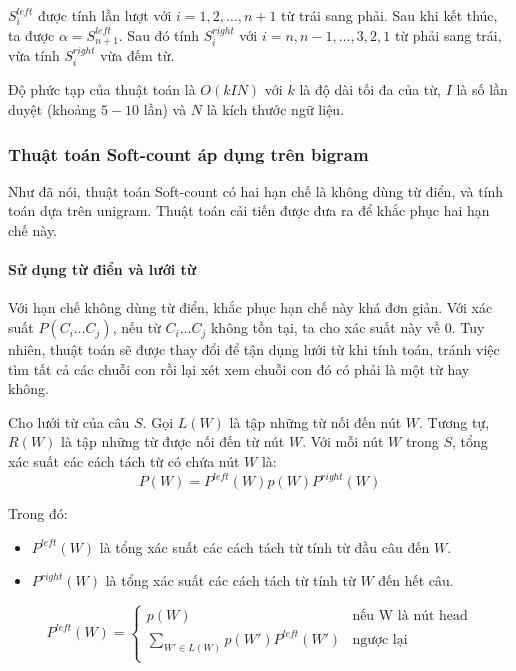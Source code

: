 \documentclass[a4paper,oneside,14pt]{extbook} %
\begin{document}
$S_i^{left}$ được tính lần lượt với $i=1,2,\ldots,n+1$ từ trái sang
phải. Sau khi kết thúc, ta được $\alpha=S_{n+1}^{left}$. Sau đó tính
$S_i^{right}$ với $i=n,n-1,\ldots,3,2,1$ từ phải sang trái, vừa tính
$S_i^{right}$ vừa đếm từ.

Độ phức tạp của thuật toán là $O(kIN)$ với $k$ là độ dài tối đa của
từ, $I$ là số lần duyệt (khoảng $5-10$ lần) và $N$ là kích thước ngữ
liệu.

\subsubsection{Thuật toán Soft-count áp dụng trên bi\-gram}

Như đã nói, thuật toán Soft-count có hai hạn chế là không dùng từ
điển, và tính toán dựa trên uni\-gram. Thuật toán cải tiến được đưa ra
để khắc phục hai hạn chế này.


\paragraph{Sử dụng từ điển và lưới từ}

Với hạn chế không dùng từ điển, khắc phục hạn chế này khá đơn
giản. Với xác suất $P(C_i\ldots C_j)$, nếu từ $C_i\ldots C_j$ không
tồn tại, ta cho xác suất này về $0$. Tuy nhiên, thuật toán sẽ được
thay đổi để tận dụng lưới từ khi tính toán, tránh việc tìm tất cả các
chuỗi con rồi lại xét xem chuỗi con đó có phải là một từ hay không.

Cho lưới từ của câu $S$. Gọi $L(W)$ là tập những từ nối đến nút
$W$. Tương tự, $R(W)$ là tập những từ được nối đến từ nút $W$.
Với mỗi nút $W$ trong $S$, tổng xác suất các cách tách từ có chứa nút
$W$ là:
$$P(W)=P^{left}(W)p(W)P^{right}(W)$$

Trong đó:
\begin{itemize}
\item $P^{left}(W)$ là tổng xác suất các cách tách từ tính từ đầu câu
  đến $W$.
\item $P^{right}(W)$ là tổng xác suất các cách tách từ tính từ $W$ đến
  hết câu.
\end{itemize}

$$
P^{left}(W) = \left\{
    \begin{array}{ll}
      p(W)&\text{nếu W là nút head}\\
      \displaystyle\sum_{W' \in L(W)}p(W')P^{left}(W')&\text{ngược lại}\\
    \end{array}
  \right.
$$
\end{document}
